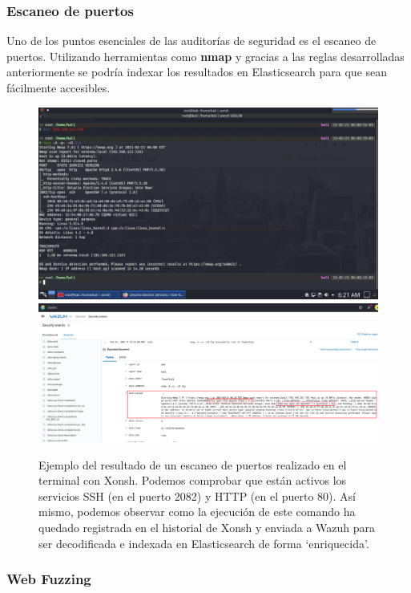 \subsubsection{Escaneo de puertos}

Uno de los puntos esenciales de las auditorías de seguridad es el escaneo de puertos. Utilizando herramientas como \textbf{nmap} y gracias a las reglas desarrolladas anteriormente se podría indexar los resultados en Elasticsearch para que sean fácilmente accesibles. 


\begin{figure}[!hbt]
  \centering
  \includegraphics[width=\textwidth]{imagenes/nmap1.png}
  \includegraphics[width=\textwidth]{imagenes/nmap2.png}  
  \caption{Ejemplo del resultado de un escaneo de puertos realizado en el terminal con Xonsh. Podemos comprobar que están activos los servicios SSH (en el puerto 2082) y HTTP (en el puerto 80). Así mismo, podemos observar como la ejecución de este comando ha quedado registrada en el historial de Xonsh y enviada a Wazuh para ser decodificada e indexada en Elasticsearch de forma `enriquecida'.}
  \label{nmapA}
\end{figure}


\subsubsection{Web \gls{Fuzzing}}

